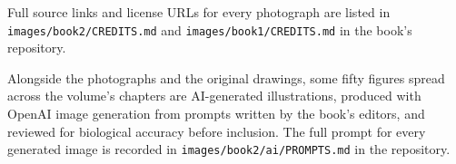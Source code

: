 Full source links and license URLs for every photograph are listed
in \texttt{images/\allowbreak book2/\allowbreak CREDITS.md} and \texttt{images/\allowbreak book1/\allowbreak CREDITS.md}
in the book's repository.

\bigskip
Alongside the photographs and the original drawings, some fifty
figures spread across the volume's chapters are AI-generated
illustrations, produced with OpenAI image generation from prompts
written by the book's editors, and reviewed for biological accuracy
before inclusion. The full prompt for every generated image is
recorded in \texttt{images/\allowbreak book2/\allowbreak ai/\allowbreak PROMPTS.md} in the repository.
\par\endgroup
\clearpage
